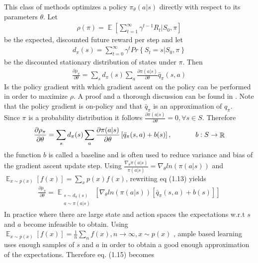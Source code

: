 This class of methods optimizes a policy $\pi_\theta(a|s)$ directly with respect to its parameters $\theta$. Let 
\begin{align}
\rho(\pi) = \mathop{\mathbb{E}}\left[ \sum_{t=1}^{\infty} \gamma^{t-1}R_t|S_0, \pi\right]
\end{align}
be the expected, discounted future reward per step and let
\begin{align}
d_\pi(s) = \sum_{t=0}^\infty \gamma^t Pr\left\{S_t=s|S_0, \pi\right\}
\end{align}
be the discounted stationary distribution of states under $\pi$. Then
\begin{align}
\frac{\partial\rho_\pi}{\partial\theta} = \sum_s d_\pi(s)\sum_a \frac{\partial\pi(a|s)}{\partial\theta} \bar{q}_\pi(s,a)
\end{align}
Is the policy gradient with which gradient ascent on the policy can be performed in order to maximize $\rho$. A proof and a thorough discussion can be found in \cite{PGBS}. Note that the policy gradient is on-policy and that $\bar{q}_\pi$ is an approximation of $q_\pi$.\\
Since $\pi$ is a probability distribution it follows $\frac{\partial\pi(a|s)}{\partial\theta}=0, \forall s \in S$. Therefore
\begin{align}
\frac{\partial\rho_\pi}{\partial\theta} = \sum_s d_\pi(s)\sum_a \frac{\partial\pi(a|s)}{\partial\theta}\left[ \bar{q}_\pi(s,a)+b(s)\right],\text{\hspace{12mm}} b:S\rightarrow \mathop{\mathbb{R}}
\end{align}
the function $b$ is called a baseline and is often used to reduce variance and bias of the gradient ascent update step. Using $\frac{\nabla_\theta\pi(a|s)}{\pi(a|s)} = \nabla_\theta ln(\pi(a|s))$ and $\mathop{\mathbb{E}}_{x\sim p(x)}[f(x)] = \sum_{x}p(x)f(x)$, rewriting eq (1.13) yields
\begin{align}
\frac{\partial\rho_\pi}{\partial\theta} = \mathop{\mathbb{E}}_{\substack{s\sim d_\pi(s) \\ a\sim \pi(a|s)}}\left[ \nabla_\theta ln (\pi(a|s))\left[ \bar{q}_\pi(s,a)+b(s)\right]\right]
\end{align}
In practice where there are large state and action spaces the expectations w.r.t $s$ and $a$ become infeasible to obtain. Using $\mathop{\mathbb{E}}_{x\sim p(x)}[f(x)] = \frac{1}{n}\sum_{n}f(x), n\rightarrow\infty, x\sim p(x)$ , ample based learning uses enough samples of $s$ and $a$ in order to obtain a good enough approximation of the expectations. Therefore eq. (1.15) becomes

